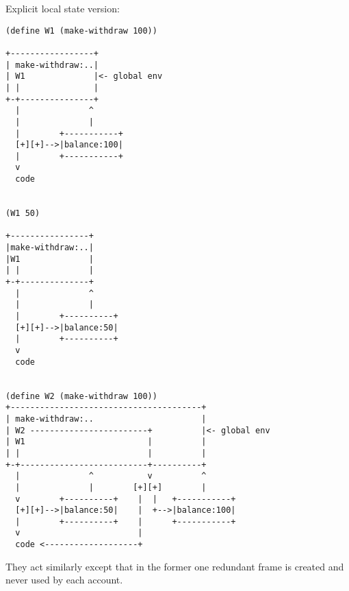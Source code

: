 \documentclass[../main.tex]{subfiles}
\begin{document}
Explicit local state version:

\begin{lstlisting}
(define W1 (make-withdraw 100))

+-----------------+
| make-withdraw:..|
| W1              |<- global env
| |               |
+-+---------------+
  |              ^
  |              |
  |        +-----------+
  [+][+]-->|balance:100|
  |        +-----------+
  v
  code


(W1 50)

+----------------+
|make-withdraw:..|
|W1              |
| |              |
+-+--------------+
  |              ^
  |              |
  |        +----------+
  [+][+]-->|balance:50|
  |        +----------+
  v
  code


(define W2 (make-withdraw 100))
+---------------------------------------+
| make-withdraw:..                      |
| W2 ------------------------+          |<- global env
| W1                         |          |
| |                          |          |
+-+--------------------------+----------+
  |              ^           v          ^
  |              |        [+][+]        |
  v        +----------+    |  |   +-----------+
  [+][+]-->|balance:50|    |  +-->|balance:100|
  |        +----------+    |      +-----------+
  v                        |
  code <-------------------+
\end{lstlisting}

They act similarly except that in the former one
 redundant frame is created and never used
 by each account.
\end{document}
